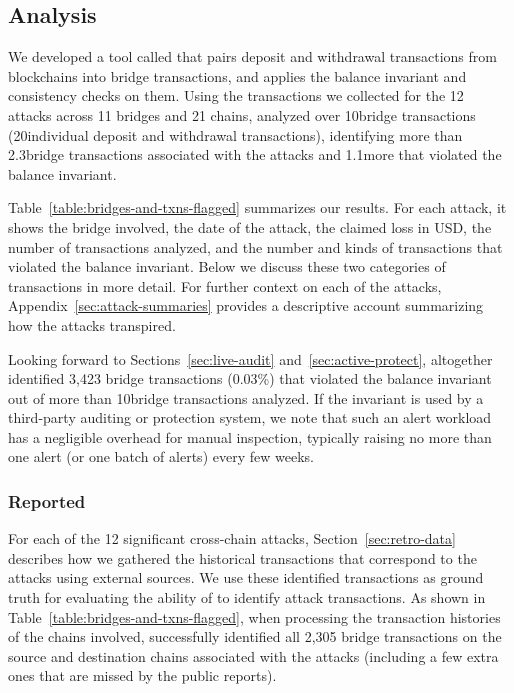 \subsection{Analysis}
\label{sec:retro-analysis}


We developed a tool called \offlinetool that pairs deposit and
withdrawal transactions from blockchains into bridge transactions, and
applies the balance invariant and consistency checks on them.  Using
the transactions we collected for the 12 attacks across 11 bridges and
21 chains, \offlinetool analyzed over 10\mil bridge transactions (20\mil individual deposit and withdrawal transactions),
identifying more than 2.3\thou bridge transactions associated with the
attacks and 1.1\thou more that violated the balance invariant.


Table~\ref{table:bridges-and-txns-flagged} summarizes our results.
For each attack, it shows the bridge involved, the date of the attack,
the claimed loss in USD, the number of transactions \offlinetool
analyzed, and the number and kinds of transactions that violated the
balance invariant.
%
Below we discuss these two categories of transactions in more detail.
For further context on each of the attacks,
Appendix~\ref{sec:attack-summaries} provides a descriptive account
summarizing how the attacks transpired.

Looking forward to Sections~\ref{sec:live-audit}
and~\ref{sec:active-protect}, altogether \offlinetool identified 3,423
bridge transactions (0.03\%) that violated the balance invariant out
of more than 10\mil bridge transactions analyzed.  If the invariant is used by a
third-party auditing or protection system, we note that such an alert
workload has a negligible overhead for manual inspection, typically
raising no more than one alert (or one batch of alerts) every few
weeks.

\subsubsection{Reported}

For each of the 12 significant cross-chain attacks,
Section~\ref{sec:retro-data} describes how we gathered the historical
transactions that correspond to the attacks using external sources.
We use these identified transactions as ground truth for evaluating
the ability of \offlinetool to identify attack transactions.  As shown
in Table~\ref{table:bridges-and-txns-flagged}, when processing the
transaction histories of the chains involved, \offlinetool
successfully identified all 2,305 bridge transactions on the source
and destination chains associated with the attacks (including a few extra ones that are missed by the public reports).

